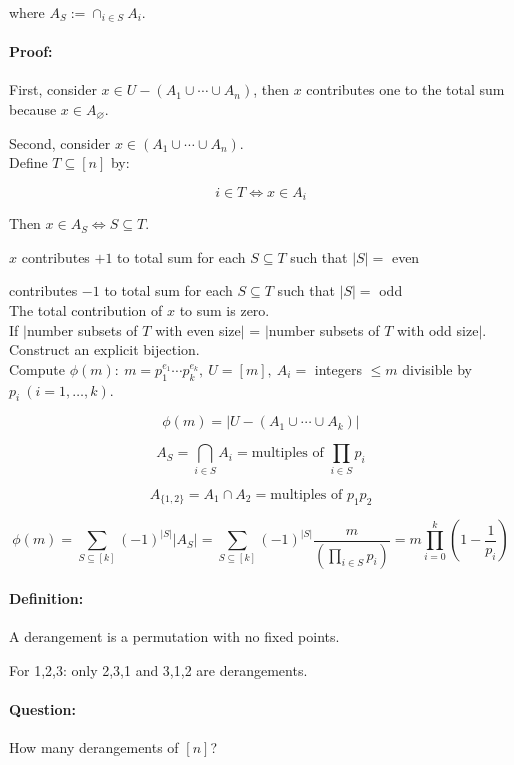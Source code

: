 \documentclass[a4paper, 11pt, twoside]{article}
\begin{document}
where $A_{S}:=\cap_{i\in S}A_i$.

\paragraph{Proof:} First, consider $x\in U-(A_1\cup \cdots \cup A_n)$, then $x$ contributes one to the total sum because $x\in A_{\varnothing}$.

Second, consider $x\in (A_1\cup\cdots \cup A_n)$.\\

Define $T\subseteq [n]$ by:

\[i\in T \iff x \in A_i\]

Then $x\in A_S\iff S\subseteq T$.

$x$ contributes $+1$ to total sum for each $S\subseteq T$ such that $|S|=$ even 

contributes $-1$ to total sum for each $S\subseteq T$ such that $|S|=$ odd\\

The total contribution of $x$ to sum is zero.\\

If $|$number subsets of $T$ with even size$|$ = $|$number subsets of $T$ with odd size$|$. Construct an explicit bijection.\\

Compute $\phi(m):\ m=p_1^{e_1}\cdots p_k^{e_k},\ U = [m],\ A_i=$ integers $\leq m$ divisible by $p_i\ (i=1,\dots ,k)$.

\[\phi(m)=|U-(A_1\cup\cdots \cup A_k)|\]

\[A_S=\bigcap_{i\in S}A_i=\text{multiples of } \prod_{i\in S}p_i\]

\[A_{\{1,2\}}=A_1\cap A_2 = \text{multiples of } p_1p_2\]

\[\phi(m)=\sum_{S\subseteq[k]}(-1)^{|S|}|A_S|=\sum_{S\subseteq[k]}(-1)^{|S|}\frac{m}{(\prod_{i\in S}p_i)}=m\prod^k_{i=0}\left(1-\frac{1}{p_i}\right)\]

\paragraph{Definition:} A derangement is a permutation with no fixed points.

For 1,2,3: only 2,3,1 and 3,1,2 are derangements.

\paragraph{Question:} How many derangements of $[n]$?
\end{document}
